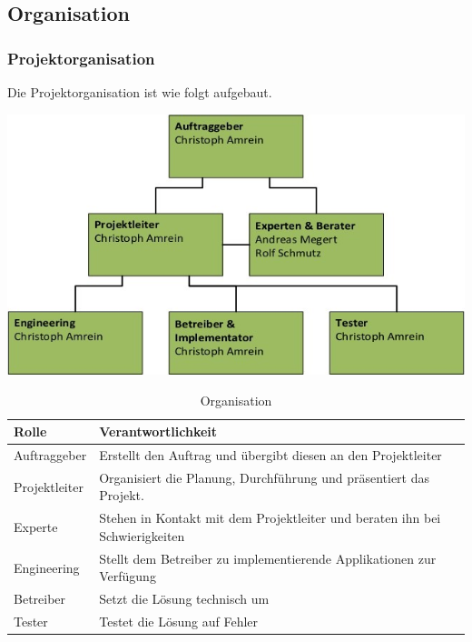\subsection{Organisation}
\subsubsection{Projektorganisation}
Die Projektorganisation ist wie folgt aufgebaut.

\includegraphics[scale=0.9]{Bilder/Projektorganisation.jpg}{\centering}

\begin{table}[H]
\centering
\begin{tabular}{p{2.5cm}p{13.5cm}}
\hline
\rowcolor{heading}\textbf{Rolle} & \textbf{Verantwortlichkeit} \\\hline
Auftraggeber & Erstellt den Auftrag und übergibt diesen an den Projektleiter \\\hline
Projektleiter & Organisiert die Planung, Durchführung und präsentiert das Projekt. \\\hline
Experte & Stehen in Kontakt mit dem Projektleiter und beraten ihn bei Schwierigkeiten \\\hline
Engineering & Stellt dem Betreiber zu implementierende Applikationen zur Verfügung \\\hline
Betreiber & Setzt die Lösung technisch um \\\hline
Tester & Testet die Lösung auf Fehler  \\\hline
\end{tabular}
\caption{Organisation}
\end{table}

